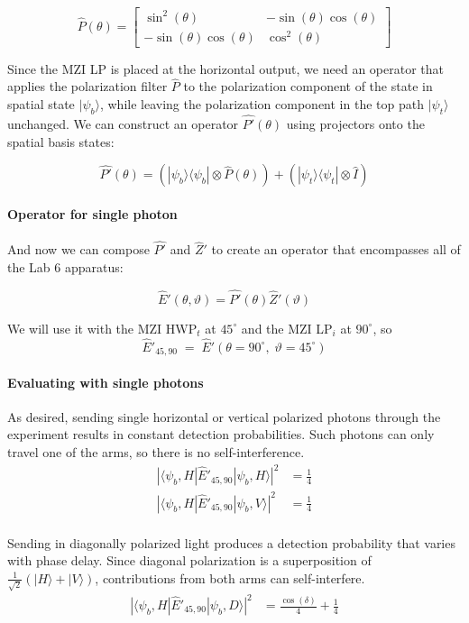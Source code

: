 \documentclass{article}
\begin{document}
$$\hat{P}(\theta) = \left[\begin{matrix}\sin^{2}{\left(\theta \right)} & - \sin{\left(\theta \right)} \cos{\left(\theta \right)}\\- \sin{\left(\theta \right)} \cos{\left(\theta \right)} & \cos^{2}{\left(\theta \right)}\end{matrix}\right]$$


Since the MZI LP is placed at the horizontal output, 
we need an operator that applies the polarization filter $\hat{P}$
to the polarization component of the state in spatial state $|\psi_b\rangle$,
while leaving the polarization component in the top path $|\psi_t\rangle$ unchanged.
We can construct an operator $\hat{P'}(\theta)$
using projectors onto the spatial basis states:

$$  \hat{P'}(\theta) = (|\psi_b\rangle\langle\psi_b| \otimes \hat{P}(\theta)) + (|\psi_t\rangle\langle\psi_t| \otimes \hat{I}) $$

\paragraph{Operator for single photon}
And now we can compose $\hat{P'}$ and $\hat{Z}'$
to create an operator that encompasses all of the Lab 6 apparatus:

$$\hat{E}'(\theta,\vartheta) = \hat{P'}(\theta) \hat{Z}'(\vartheta)$$

We will use it with the MZI HWP$_t$ at $45^\circ$ and the
MZI LP$_i$ at $90^\circ$, so
$$
\hat{E}'_{45,90}\;=\;
\hat{E}'\!\left(\theta=90^\circ,\;\vartheta=45^\circ\right)
$$


\paragraph{Evaluating with single photons}

As desired, sending single horizontal or vertical polarized photons through
the experiment results in constant detection probabilities.
Such photons can only travel one of the arms, so there is no self-interference.
\begin{align*}
|\langle \psi_b,H |\hat{E}'_{45,90} |\psi_b, H\rangle|^2 &= \frac{1}{4} \\
|\langle \psi_b,H |\hat{E}'_{45,90} |\psi_b, V\rangle|^2 &= \frac{1}{4} \\
\end{align*}

Sending in diagonally polarized light produces a detection
probability that varies with phase delay.
Since diagonal polarization is a superposition of
$\frac{1}{\sqrt2}(|H\rangle+|V\rangle)$,
contributions from both arms can self-interfere.
\begin{align*}
|\langle \psi_b,H |\hat{E}'_{45,90} |\psi_b, D\rangle|^2 &= \frac{\cos{\left(\delta \right)}}{4} + \frac{1}{4}
\end{align*}
\end{document}
